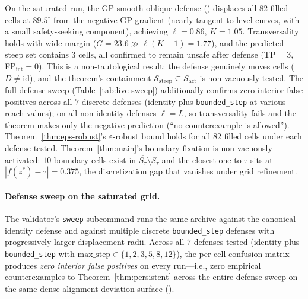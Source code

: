 \documentclass{article}
\newcommand{\cl}[1]{\overline{#1}}
\begin{document}
On the saturated run, the GP-smooth oblique defense
() displaces all $82$ filled
cells at $89.5^\circ$ from the negative GP gradient (nearly tangent
to level curves, with a small safety-seeking component), achieving
$\ell = 0.86$, $K = 1.05$. Transversality holds with wide margin
($G = 23.6 \gg \ell(K{+}1) = 1.77$), and the predicted steep set
contains $3$ cells, all confirmed to remain unsafe after defense
(TP${} = 3$, FP${}_{\text{int}} = 0$). This is a
non-tautological result: the defense genuinely moves cells
($D \neq \mathrm{id}$), and the theorem's containment
$\mathcal{S}_{\text{steep}} \subseteq \mathcal{S}_{\text{act}}$ is
non-vacuously tested.
The full defense sweep (Table~\ref{tab:live-sweep}) additionally
confirms zero interior false positives across all $7$ discrete
defenses (identity plus \texttt{bounded\_step} at various reach
values); on all non-identity defenses $\ell = L$, so
transversality fails and the theorem makes only the negative
prediction (``no counterexample is allowed'').
Theorem~\ref{thm:eps-robust}'s $\varepsilon$-robust bound holds
for all $82$ filled cells under each defense tested.
Theorem~\ref{thm:main}'s boundary fixation is non-vacuously
activated: $10$ boundary cells exist in
$\cl{S_\tau} \setminus S_\tau$ and the closest one to $\tau$ sits
at $|f(z^{*}) - \tau| = 0.375$, the discretization gap that
vanishes under grid refinement.

\paragraph{Defense sweep on the saturated grid.}
The validator's \texttt{sweep} subcommand runs the same archive
against the canonical identity defense and against multiple
discrete \texttt{bounded\_step} defenses with progressively larger
displacement radii. Across all $7$ defenses tested
(identity plus \texttt{bounded\_step} with
$\text{max\_step} \in \{1, 2, 3, 5, 8, 12\}$), the per-cell
confusion-matrix produces \emph{zero interior false positives} on
every run---i.e., zero empirical counterexamples to
Theorem~\ref{thm:persistent} across the entire defense sweep on
the same dense alignment-deviation surface
().
\end{document}
